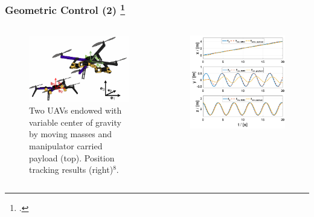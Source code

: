 \begin{frame}
	\frametitle{Geometric Control (2) \footcite{Markovic2019}}
	
	\begin{columns}
		\begin{column}{0.5\textwidth}\centering
			\begin{figure}[H]
				\includegraphics[width=0.8\columnwidth]{figures/uav.png}	
				\centering
				\caption{Two UAVs endowed with variable center of gravity by moving masses and manipulator carried payload (top). Position tracking results (right)${}^{8}$. }
				\label{fig:uav_model}
			\end{figure}
		\end{column}
		
		\begin{column}{0.5\textwidth}\centering
			\begin{figure}
				\centering
				\includegraphics[width=0.95\columnwidth]{figures/both_pos_crop.pdf}
				\label{fig:traj_pos}
			\end{figure}
		\end{column}
	\end{columns}
\end{frame}

